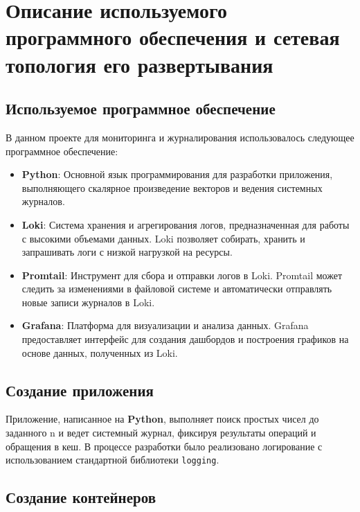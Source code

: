 \graphicspath{{./img/}}
\section{Описание используемого программного обеспечения
	и сетевая топология его развертывания}

\subsection{Используемое программное обеспечение}

В данном проекте для мониторинга
и журналирования использовалось следующее программное обеспечение:

\begin{itemize}
    \item \textbf{Python}: Основной язык программирования
		для разработки приложения,
		выполняющего скалярное произведение векторов
		и ведения системных журналов.
    \item \textbf{Loki}: Система хранения и агрегирования логов,
		предназначенная для работы с высокими объемами данных.
		Loki позволяет собирать,
		хранить и запрашивать логи с низкой нагрузкой на ресурсы.
    \item \textbf{Promtail}: Инструмент для сбора и отправки логов в Loki.
		Promtail может следить за изменениями в файловой системе
		и автоматически отправлять новые записи журналов в Loki.
    \item \textbf{Grafana}: Платформа для визуализации и анализа данных.
		Grafana предоставляет интерфейс для создания дашбордов
		и построения графиков на основе данных, полученных из Loki.
\end{itemize}

\subsection{Создание приложения}

Приложение, написанное на \textbf{Python},
выполняет поиск простых чисел до заданного n и ведет системный журнал,
фиксируя результаты операций и обращения в кеш.
В процессе разработки было реализовано логирование
с использованием стандартной библиотеки \texttt{logging}. 

\break



\subsection{Создание контейнеров}

